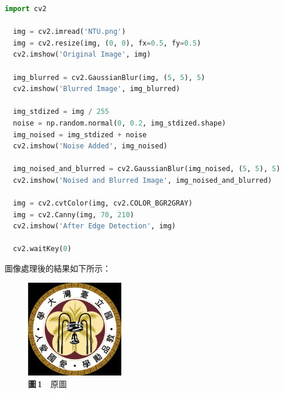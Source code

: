   \begin{lstlisting}[language=Python]
  import cv2

  img = cv2.imread('NTU.png')
  img = cv2.resize(img, (0, 0), fx=0.5, fy=0.5)
  cv2.imshow('Original Image', img)

  img_blurred = cv2.GaussianBlur(img, (5, 5), 5)
  cv2.imshow('Blurred Image', img_blurred)

  img_stdized = img / 255
  noise = np.random.normal(0, 0.2, img_stdized.shape)
  img_noised = img_stdized + noise
  cv2.imshow('Noise Added', img_noised)

  img_noised_and_blurred = cv2.GaussianBlur(img_noised, (5, 5), 5)
  cv2.imshow('Noised and Blurred Image', img_noised_and_blurred)

  img = cv2.cvtColor(img, cv2.COLOR_BGR2GRAY)
  img = cv2.Canny(img, 70, 210)
  cv2.imshow('After Edge Detection', img)

  cv2.waitKey(0)
  \end{lstlisting}
  \noindent 圖像處理後的結果如下所示：
  \noindent \\
  \begin{figure}[h!]
  \centering
    \begin{minipage}{0.25\linewidth}
      \centering
      \includegraphics[width=120pt]{NTU original.jpg}
      \caption*{\textbf{圖\,1}\(\quad\)原圖}
    \end{minipage}
  \end{figure}
  \newpage

